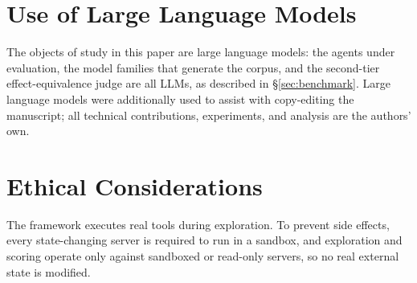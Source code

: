 \section*{Use of Large Language Models}
The objects of study in this paper are large language models: the agents
under evaluation, the model families that generate the corpus, and the
second-tier effect-equivalence judge are all LLMs, as described in
\S\ref{sec:benchmark}. Large language models were additionally used to assist
with copy-editing the manuscript; all technical contributions, experiments,
and analysis are the authors' own.

\section*{Ethical Considerations}
The framework executes real tools during exploration. To prevent side
effects, every state-changing server is required to run in a sandbox, and
exploration and scoring operate only against sandboxed or read-only servers,
so no real external state is modified.
